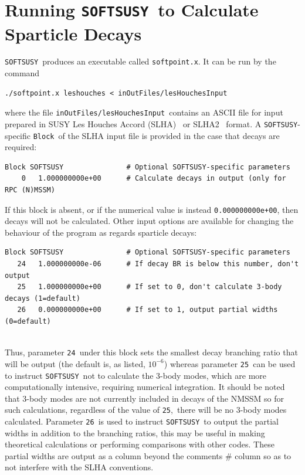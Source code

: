 \documentclass[final,3p,times,pdflatex]{elsarticle}
\def\SOFTSUSY{{\tt SOFTSUSY}}
\def\code#1{{\tt #1}}
\begin{document}
\appendix

\section{Running \SOFTSUSY~to Calculate Sparticle Decays} \label{sec:run}

\SOFTSUSY~produces an executable called \code{softpoint.x}. It can be run by
the command
\begin{verbatim}
./softpoint.x leshouches < inOutFiles/lesHouchesInput
\end{verbatim}
where the file \code{inOutFiles/lesHouchesInput}~contains an ASCII file
for input
prepared in SUSY Les Houches Accord (SLHA)~\cite{Skands:2003cj} or
SLHA2~\cite{Allanach:2008qq} format. 
A \code{SOFTSUSY}-specific \code{Block}~of the SLHA input file is provided in
the case that decays are required:
\begin{verbatim}
Block SOFTSUSY               # Optional SOFTSUSY-specific parameters
    0   1.000000000e+00      # Calculate decays in output (only for RPC (N)MSSM)
\end{verbatim}
If this block is absent, or if the numerical value is instead
\code{0.000000000e+00}, then decays will not be calculated. 
Other input options are available for changing the behaviour of the program as
regards sparticle decays:
\begin{verbatim}
Block SOFTSUSY               # Optional SOFTSUSY-specific parameters
   24   1.000000000e-06      # If decay BR is below this number, don't output
   25   1.000000000e+00      # If set to 0, don't calculate 3-body decays (1=default)
   26   0.000000000e+00      # If set to 1, output partial widths (0=default)
   
\end{verbatim}
Thus, parameter \code{24}~under this block sets the smallest decay branching
ratio that will be output (the default is, as listed, $10^{-6}$) whereas 
parameter \code{25}~can be used to instruct \code{SOFTSUSY}~not to calculate
the 3-body modes, which are more computationally intensive, requiring
numerical integration. It should be noted that 3-body modes are not currently
included 
in decays of the NMSSM so for such calculations, regardless of the value
of \code{25},~there will be no 3-body modes calculated. Parameter \code{26}~is used to
instruct 
\code{SOFTSUSY}~to output the partial widths in addition to the branching
ratios, this 
may be useful in making theoretical calculations or performing comparisons
with other 
codes. These partial widths are output as a column beyond the comments $\#$
column so 
as to not interfere with the SLHA conventions. 
\end{document}
